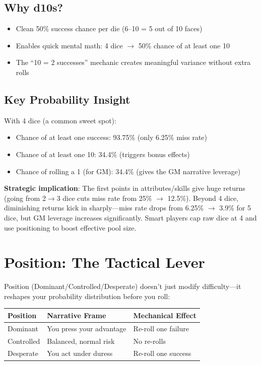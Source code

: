 \documentclass[11pt]{article}
\begin{document}
\subsection{Why d10s?}
\begin{itemize}
    \item Clean 50\% success chance per die (6--10 = 5 out of 10 faces)
    \item Enables quick mental math: 4 dice $\rightarrow$ 50\% chance of at least one 10
    \item The ``10 = 2 successes'' mechanic creates meaningful variance without extra rolls
\end{itemize}

\subsection{Key Probability Insight}
With 4 dice (a common sweet spot):
\begin{itemize}
    \item Chance of at least one success: 93.75\% (only 6.25\% miss rate)
    \item Chance of at least one 10: 34.4\% (triggers bonus effects)
    \item Chance of rolling a 1 (for GM): 34.4\% (gives the GM narrative leverage)
\end{itemize}

\textbf{Strategic implication}: The first points in attributes/skills give huge returns (going from 2$\rightarrow$3 dice cuts miss rate from 25\% $\rightarrow$ 12.5\%). Beyond 4 dice, diminishing returns kick in sharply---miss rate drops from 6.25\% $\rightarrow$ 3.9\% for 5 dice, but GM leverage increases significantly. Smart players cap raw dice at 4 and use positioning to boost effective pool size.

\section{Position: The Tactical Lever}

Position (Dominant/Controlled/Desperate) doesn't just modify difficulty---it reshapes your probability distribution before you roll:

\begin{table}[h]
\centering
\begin{tabular}{lll}
\toprule
\textbf{Position} & \textbf{Narrative Frame} & \textbf{Mechanical Effect} \\
\midrule
Dominant & You press your advantage & Re-roll one failure \\
Controlled & Balanced, normal risk & No re-rolls \\
Desperate & You act under duress & Re-roll one success \\
\bottomrule
\end{tabular}
\end{table}
\end{document}
